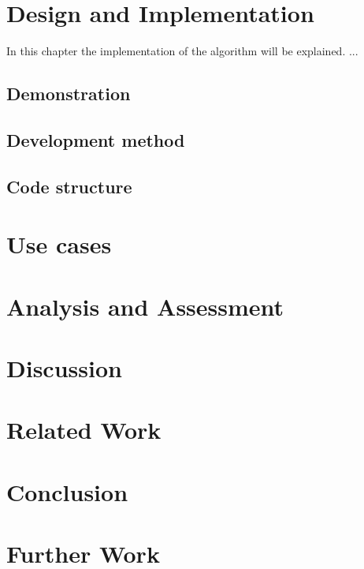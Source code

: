 \documentclass[a4paper]{report}
\begin{document}
\chapter{Design and Implementation} \label{Design and Implementation}
In this chapter the implementation of the algorithm will be explained. ...
\section{Demonstration} \label{demonstration}
\section{Development method}
\section{Code structure} \label{CodeStructure}


\chapter{Use cases} \label{Use Cases}
\chapter{Analysis and Assessment}\label{Analysis and Assessment}
\chapter{Discussion} \label{Discussion}
\chapter{Related Work} \label{Related Work}
\chapter{Conclusion} \label{Conclusion}
\chapter{Further Work} \label{Further Work}

\appendix


%
%
\printbibliography
\end{document}
